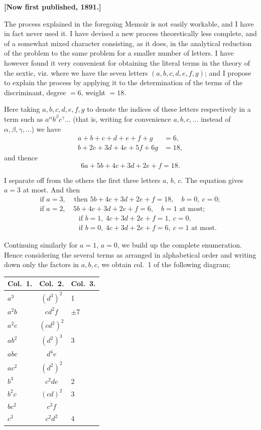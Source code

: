 \documentclass[11pt,a4paper]{article}
\theoremstyle{definition}
\begin{document}
\textbf{[Now first published, 1891.]}

The process explained in the foregoing Memoir is not easily workable, and I have in fact never used it. I have devised a new process theoretically less complete, and of a somewhat mixed character consisting, as it does, in the analytical reduction of the problem to the same problem for a smaller number of letters. I have however found it very convenient for obtaining the literal terms in the theory of the sextic, viz. where we have the seven letters $(a,b,c,d,e,f,g)$; and I propose to explain the process by applying it to the determination of the terms of the discriminant, degree $=6$, weight $=18$.

Here taking $a,b,c,d,e,f,g$ to denote the indices of these letters respectively in a term such as $a^\alpha b^\beta c^\gamma\ldots$ (that is, writing for convenience $a,b,c,\ldots$ instead of $\alpha,\beta,\gamma,\ldots$) we have
\begin{align*}
a+b+c+d+e+f+g &= 6,\\
b+2c+3d+4e+5f+6g &= 18,
\end{align*}
and thence
\[
6a+5b+4c+3d+2e+f=18.
\]

I separate off from the others the first three letters $a$, $b$, $c$. The equation gives $a=3$ at most. And then
\begin{align*}
\text{if }a=3,&\text{ then }5b+4c+3d+2e+f=18,\quad b=0,\ c=0;\\
\text{if }a=2,&\ 5b+4c+3d+2e+f=6,\quad b=1\text{ at most};\\
&\quad\text{if }b=1,\ 4c+3d+2e+f=1,\ c=0,\\
&\quad\text{if }b=0,\ 4c+3d+2e+f=6,\ c=1\text{ at most}.
\end{align*}

Continuing similarly for $a=1$, $a=0$, we build up the complete enumeration. Hence considering the several terms as arranged in alphabetical order and writing down only the factors in $a,b,c$, we obtain col.~1 of the following diagram;

\begin{center}
\begin{tabular}{lcl}
Col.~1. & Col.~2. & Col.~3. \\
\midrule
$a^3$ & $(d^3)^2$ & 1 \\
$a^2b$ & $cd^2f$ & $\pm7$ \\
$a^2c$ & $(cd^2)^2$ & \\
$ab^2$ & $(d^2)^3$ & 3 \\
$abc$ & $d^4e$ & \\
$ac^2$ & $(d^2)^2$ & \\
$b^3$ & $c^2de$ & 2 \\
$b^2c$ & $(cd)^2$ & 3 \\
$bc^2$ & $c^3f$ & \\
$c^3$ & $c^2d^2$ & 4 \\
\end{tabular}
\end{center}
\end{document}
